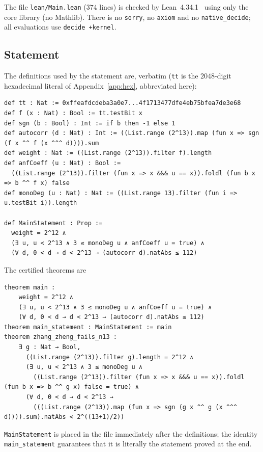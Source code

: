 \documentclass[11pt]{article}
\numberwithin{equation}{section}
\theoremstyle{definition}
\theoremstyle{remark}
\begin{document}
The file \texttt{lean/Main.lean} ($374$ lines) is checked by Lean~4.34.1~\cite{Lean4} using only the
core library (no Mathlib). There is no \texttt{sorry}, no \texttt{axiom} and no \texttt{native\_decide};
all evaluations use \texttt{decide +kernel}.

\subsection{Statement}
The definitions used by the statement are, verbatim (\texttt{tt} is the $2048$-digit hexadecimal literal of
Appendix~\ref{app:hex}, abbreviated here):
\begin{lstlisting}
def tt : Nat := 0xffeafdcdeba3a0e7...4f1713477dfe4eb75bfea7de3e68
def f (x : Nat) : Bool := tt.testBit x
def sgn (b : Bool) : Int := if b then -1 else 1
def autocorr (d : Nat) : Int := ((List.range (2^13)).map (fun x => sgn (f x ^^ f (x ^^^ d)))).sum
def weight : Nat := ((List.range (2^13)).filter f).length
def anfCoeff (u : Nat) : Bool :=
  ((List.range (2^13)).filter (fun x => x &&& u == x)).foldl (fun b x => b ^^ f x) false
def monoDeg (u : Nat) : Nat := ((List.range 13).filter (fun i => u.testBit i)).length

def MainStatement : Prop :=
  weight = 2^12 ∧
  (∃ u, u < 2^13 ∧ 3 ≤ monoDeg u ∧ anfCoeff u = true) ∧
  (∀ d, 0 < d → d < 2^13 → (autocorr d).natAbs ≤ 112)
\end{lstlisting}
The certified theorems are
\begin{lstlisting}
theorem main :
    weight = 2^12 ∧
    (∃ u, u < 2^13 ∧ 3 ≤ monoDeg u ∧ anfCoeff u = true) ∧
    (∀ d, 0 < d → d < 2^13 → (autocorr d).natAbs ≤ 112)
theorem main_statement : MainStatement := main
theorem zhang_zheng_fails_n13 :
    ∃ g : Nat → Bool,
      ((List.range (2^13)).filter g).length = 2^12 ∧
      (∃ u, u < 2^13 ∧ 3 ≤ monoDeg u ∧
        ((List.range (2^13)).filter (fun x => x &&& u == x)).foldl (fun b x => b ^^ g x) false = true) ∧
      (∀ d, 0 < d → d < 2^13 →
        (((List.range (2^13)).map (fun x => sgn (g x ^^ g (x ^^^ d)))).sum).natAbs < 2^((13+1)/2))
\end{lstlisting}
\texttt{MainStatement} is placed in the file immediately after the definitions; the identity
\texttt{main\_statement} guarantees that it is literally the statement proved at the end.
\end{document}
